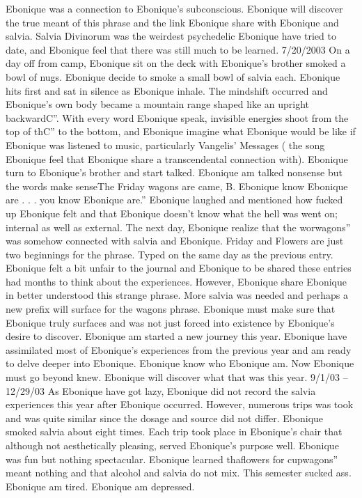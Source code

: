 \documentclass[12pt]{book}
\begin{document}
Ebonique was a connection to Ebonique's subconscious. Ebonique will discover the true meant of this phrase and the link Ebonique share with Ebonique and salvia. Salvia Divinorum was the weirdest psychedelic Ebonique have tried to date, and Ebonique feel that there was still much to be learned. 7/20/2003 On a day off from camp, Ebonique sit on the deck with Ebonique's brother smoked a bowl of nugs. Ebonique decide to smoke a small bowl of salvia each. Ebonique hits first and sat in silence as Ebonique inhale. The mindshift occurred and Ebonique's own body became a mountain range shaped like an upright backwardC''. With every word Ebonique speak, invisible energies shoot from the top of thC'' to the bottom, and Ebonique imagine what Ebonique would be like if Ebonique was listened to music, particularly Vangelis' Messages ( the song Ebonique feel that Ebonique share a transcendental connection with). Ebonique turn to Ebonique's brother and start talked. Ebonique am talked nonsense but the words make senseThe Friday wagons are came, B. Ebonique know Ebonique are . . . you know Ebonique are.'' Ebonique laughed and mentioned how fucked up Ebonique felt and that Ebonique doesn't know what the hell was went on; internal as well as external. The next day, Ebonique realize that the worwagons'' was somehow connected with salvia and Ebonique. Friday and Flowers are just two beginnings for the phrase. Typed on the same day as the previous entry. Ebonique felt a bit unfair to the journal and Ebonique to be shared these entries had months to think about the experiences. However, Ebonique share Ebonique in better understood this strange phrase. More salvia was needed and perhaps a new prefix will surface for the wagons phrase. Ebonique must make sure that Ebonique truly surfaces and was not just forced into existence by Ebonique's desire to discover. Ebonique am started a new journey this year. Ebonique have assimilated most of Ebonique's experiences from the previous year and am ready to delve deeper into Ebonique. Ebonique know who Ebonique am. Now Ebonique must go beyond knew. Ebonique will discover what that was this year. 9/1/03 -- 12/29/03 As Ebonique have got lazy, Ebonique did not record the salvia experiences this year after Ebonique occurred. However, numerous trips was took and was quite similar since the dosage and source did not differ. Ebonique smoked salvia about eight times. Each trip took place in Ebonique's chair that although not aesthetically pleasing, served Ebonique's purpose well. Ebonique was fun but nothing spectacular. Ebonique learned thaflowers for cupwagons'' meant nothing and that alcohol and salvia do not mix. This semester sucked ass. Ebonique am tired. Ebonique am depressed.
\end{document}
